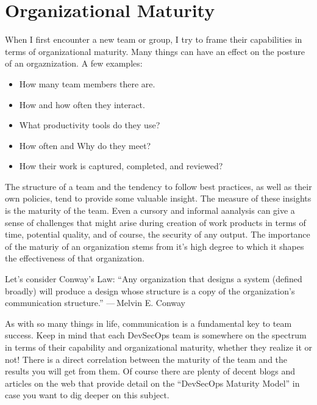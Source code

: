 \section{Organizational Maturity}

\justify{}
When I first encounter a new team or group, I try to frame their capabilities in terms of organizational maturity. 
Many things can have an effect on the posture of an orgaznization. A few examples: 

\begin{itemize}
\item How many team members there are.
\item How and how often they interact.
\item What productivity tools do they use?
\item How often and Why do they meet?
\item How their work is captured, completed, and reviewed? 
\end{itemize}

The structure of a team and the tendency to follow best practices, as well as their own policies, tend to provide some
valuable insight. The measure of these insights is the maturity of the team. Even a cursory and informal aanalysis can give
a sense of challenges that might arise during creation of work products in terms of time, potential quality, and of course, 
the security of any output. The importance of the maturiy of an organization stems from it's high degree to which it shapes
the effectiveness of that organization.

\justify{}
Let's consider Conway's Law:
\justify{}
``Any organization that designs a system (defined broadly) will produce a design whose structure is a copy of the
organization's communication structure.'' — Melvin E. Conway

\justify{}
As with so many things in life, communication is a fundamental key to team success. Keep in mind that each DevSecOps
team is somewhere on the spectrum in terms of their capability and organizational maturity, whether they realize it or not!
There is a direct correlation between the maturity of the team and the results you will get from them. Of course there are
plenty of decent blogs and articles on the web that provide detail on the ``DevSecOps Maturity Model'' in case you want to
dig deeper on this subject.
